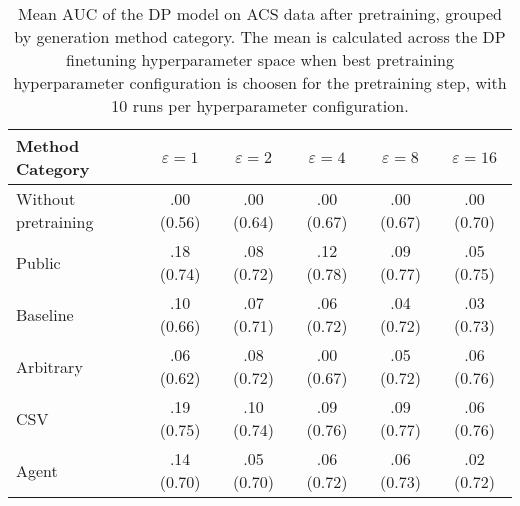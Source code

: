\begin{table}[h!]
    \centering
    \caption{Mean AUC of the DP model on ACS data after pretraining, grouped by generation method category. The mean is calculated across the DP finetuning hyperparameter space when best pretraining hyperparameter configuration is choosen for the pretraining step, with 10 runs per hyperparameter configuration.}
    \label{tab:epsilon_comparison}
    \begin{tabular}{lccccc}
    \toprule
    Method Category & $\varepsilon=1$ & $\varepsilon=2$ & $\varepsilon=4$ & $\varepsilon=8$ & $\varepsilon=16$ \\
    \midrule
    Without pretraining & .00 {\small (0.56)} & .00 {\small (0.64)} & .00 {\small (0.67)} & .00 {\small (0.67)} & .00 {\small (0.70)} \\
    \arrayrulecolor{black!50!}\midrule
    Public & \cellcolor{silver!30}.18 {\small (0.74)} & \cellcolor{silver!30}.08 {\small (0.72)} & \cellcolor{gold!30}.12 {\small (0.78)} & \cellcolor{gold!30}.09 {\small (0.77)} & \cellcolor{bronze!30}.05 {\small (0.75)} \\
    \arrayrulecolor{black!50!}\midrule
    Baseline & .10 {\small (0.66)} & \cellcolor{bronze!30}.07 {\small (0.71)} & \cellcolor{bronze!30}.06 {\small (0.72)} & .04 {\small (0.72)} & .03 {\small (0.73)} \\
    \arrayrulecolor{black!50!}\midrule
    Arbitrary & .06 {\small (0.62)} & \cellcolor{silver!30}.08 {\small (0.72)} & .00 {\small (0.67)} & \cellcolor{bronze!30}.05 {\small (0.72)} & \cellcolor{silver!30}.06 {\small (0.76)} \\
    \arrayrulecolor{black!50!}\midrule
    CSV & \cellcolor{gold!30}.19 {\small (0.75)} & \cellcolor{gold!30}.10 {\small (0.74)} & \cellcolor{silver!30}.09 {\small (0.76)} & \cellcolor{gold!30}.09 {\small (0.77)} & \cellcolor{gold!30}.06 {\small (0.76)} \\
    Agent & \cellcolor{bronze!30}.14 {\small (0.70)} & .05 {\small (0.70)} & .06 {\small (0.72)} & \cellcolor{silver!30}.06 {\small (0.73)} & .02 {\small (0.72)} \\
    \bottomrule
    \end{tabular}
\end{table}